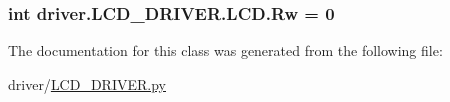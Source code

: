 \subsubsection[{Rw}]{\setlength{\rightskip}{0pt plus 5cm}int driver.\+L\+C\+D\+\_\+\+D\+R\+I\+V\+E\+R.\+L\+C\+D.\+Rw = 0\hspace{0.3cm}{\ttfamily [static]}}\label{classdriver_1_1LCD__DRIVER_1_1LCD_aa414dbce7b4b58751c5c08c8cf5bb406}


The documentation for this class was generated from the following file\+:\begin{DoxyCompactItemize}
\item 
driver/\hyperlink{driver_2LCD__DRIVER_8py}{L\+C\+D\+\_\+\+D\+R\+I\+V\+E\+R.\+py}\end{DoxyCompactItemize}
